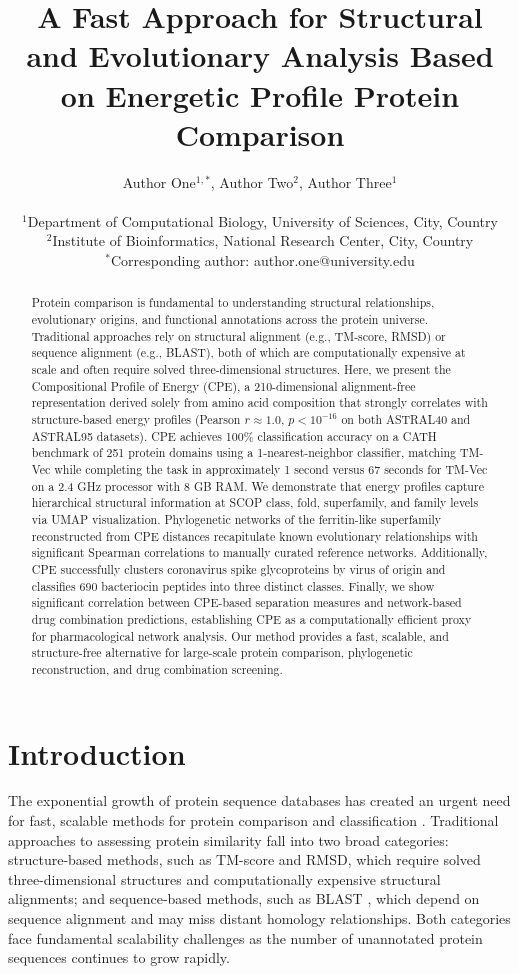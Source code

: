 \documentclass[11pt]{article}
\title{A Fast Approach for Structural and Evolutionary Analysis Based on Energetic Profile Protein Comparison}
\author{
Author One$^{1,*}$, Author Two$^{2}$, Author Three$^{1}$ \\
\\
$^{1}$Department of Computational Biology, University of Sciences, City, Country \\
$^{2}$Institute of Bioinformatics, National Research Center, City, Country \\
$^{*}$Corresponding author: author.one@university.edu
}
\date{}
\begin{document}
\maketitle

\begin{abstract}
Protein comparison is fundamental to understanding structural relationships, evolutionary origins, and functional annotations across the protein universe. Traditional approaches rely on structural alignment (e.g., TM-score, RMSD) or sequence alignment (e.g., BLAST), both of which are computationally expensive at scale and often require solved three-dimensional structures. Here, we present the Compositional Profile of Energy (CPE), a 210-dimensional alignment-free representation derived solely from amino acid composition that strongly correlates with structure-based energy profiles (Pearson $r \approx 1.0$, $p < 10^{-16}$ on both ASTRAL40 and ASTRAL95 datasets). CPE achieves 100\% classification accuracy on a CATH benchmark of 251 protein domains using a 1-nearest-neighbor classifier, matching TM-Vec while completing the task in approximately 1 second versus 67 seconds for TM-Vec on a 2.4 GHz processor with 8 GB RAM. We demonstrate that energy profiles capture hierarchical structural information at SCOP class, fold, superfamily, and family levels via UMAP visualization. Phylogenetic networks of the ferritin-like superfamily reconstructed from CPE distances recapitulate known evolutionary relationships with significant Spearman correlations to manually curated reference networks. Additionally, CPE successfully clusters coronavirus spike glycoproteins by virus of origin and classifies 690 bacteriocin peptides into three distinct classes. Finally, we show significant correlation between CPE-based separation measures and network-based drug combination predictions, establishing CPE as a computationally efficient proxy for pharmacological network analysis. Our method provides a fast, scalable, and structure-free alternative for large-scale protein comparison, phylogenetic reconstruction, and drug combination screening.
\end{abstract}

\section{Introduction}

The exponential growth of protein sequence databases has created an urgent need for fast, scalable methods for protein comparison and classification \citep{berman2000}. Traditional approaches to assessing protein similarity fall into two broad categories: structure-based methods, such as TM-score \citep{zhang2005} and RMSD, which require solved three-dimensional structures and computationally expensive structural alignments; and sequence-based methods, such as BLAST \citep{altschul1990}, which depend on sequence alignment and may miss distant homology relationships. Both categories face fundamental scalability challenges as the number of unannotated protein sequences continues to grow rapidly.
\end{document}
